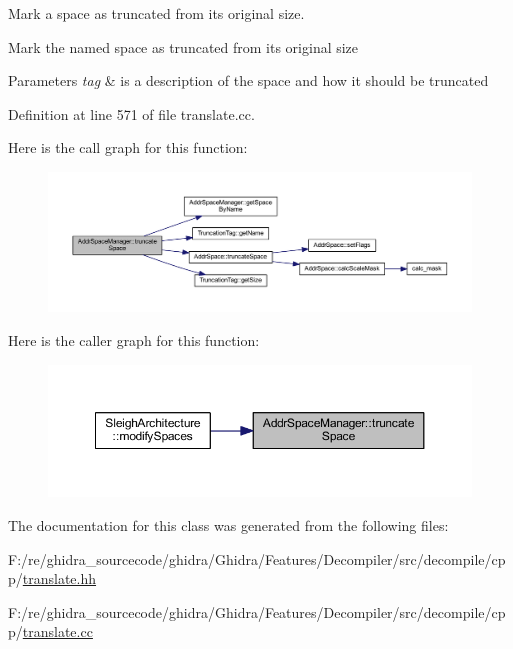 Mark a space as truncated from its original size. 

Mark the named space as truncated from its original size 
\begin{DoxyParams}{Parameters}
{\em tag} & is a description of the space and how it should be truncated \\
\hline
\end{DoxyParams}


Definition at line 571 of file translate.\+cc.

Here is the call graph for this function\+:
\nopagebreak
\begin{figure}[H]
\begin{center}
\leavevmode
\includegraphics[width=350pt]{class_addr_space_manager_aef7d980ea2fc0c6450e941fd7dbec7e6_cgraph}
\end{center}
\end{figure}
Here is the caller graph for this function\+:
\nopagebreak
\begin{figure}[H]
\begin{center}
\leavevmode
\includegraphics[width=350pt]{class_addr_space_manager_aef7d980ea2fc0c6450e941fd7dbec7e6_icgraph}
\end{center}
\end{figure}


The documentation for this class was generated from the following files\+:\begin{DoxyCompactItemize}
\item 
F\+:/re/ghidra\+\_\+sourcecode/ghidra/\+Ghidra/\+Features/\+Decompiler/src/decompile/cpp/\mbox{\hyperlink{translate_8hh}{translate.\+hh}}\item 
F\+:/re/ghidra\+\_\+sourcecode/ghidra/\+Ghidra/\+Features/\+Decompiler/src/decompile/cpp/\mbox{\hyperlink{translate_8cc}{translate.\+cc}}\end{DoxyCompactItemize}
